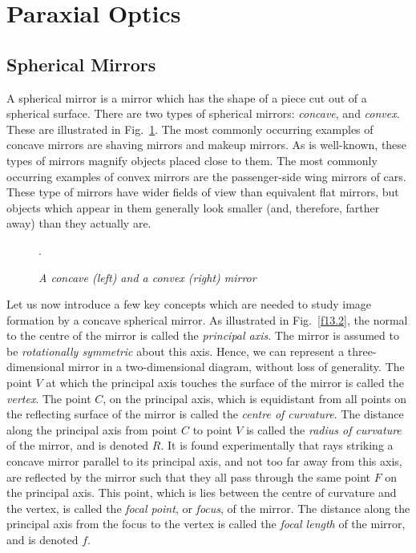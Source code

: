 \section{Paraxial Optics}
 
\subsection{Spherical Mirrors}
A spherical mirror is a mirror which has the shape of a piece
cut out of a spherical surface. There are two types of spherical
 mirrors: {\em concave}, and {\em convex}. These are illustrated
 in Fig.~\ref{f13.1}. The most commonly occurring examples of concave mirrors
are  shaving mirrors and makeup mirrors.
As is well-known,  these types of mirrors
magnify objects placed close to them. The most commonly
occurring examples of convex mirrors are the passenger-side wing
mirrors of  cars. These type of mirrors have wider fields of view than
equivalent flat mirrors, but objects which appear in them
generally  look
smaller (and, therefore, farther away) than they actually are. 

\begin{figure}[h]
\epsfysize=2.5in
\centerline{}
\caption{\em A concave (left) and a convex (right) mirror}.\label{f13.1}
\end{figure}

Let us now introduce  a few key concepts which are needed to
study  image formation by a concave spherical mirror. 
As illustrated in Fig.~\ref{f13.2}, the normal to the centre of
the mirror is called the {\em principal axis}.
The mirror is assumed to be {\em rotationally symmetric}\/ about
this axis. Hence, we can  represent a three-dimensional
mirror in a two-dimensional diagram, without loss of generality. 
The point $V$ at which the principal axis touches the surface of the
mirror is called the {\em vertex}. The point $C$, on the principal
axis, which is equidistant from all points on the reflecting
surface of the mirror is called the {\em centre of curvature}.
 The distance along the principal axis from point $C$
to point $V$ is called the {\em radius of curvature}\/ of the mirror,
and is denoted $R$. It is found experimentally that rays striking a
concave mirror parallel to its principal axis, and not too far away
from this axis, are reflected by the mirror such that they all pass
through the same point $F$ on the principal axis. This
point, which is lies between the centre of curvature and the vertex, is
called the {\em focal point}, or {\em focus}, of the mirror.
The distance along the principal axis from the focus to the
vertex is called the {\em focal length}\/ of the mirror, and is
denoted $f$. 

